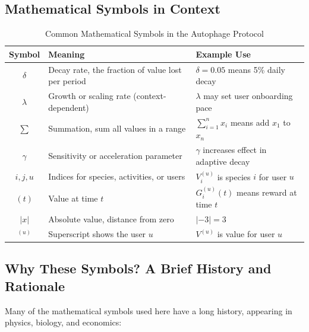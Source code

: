 \documentclass[11pt,letterpaper]{article}
\begin{document}
\subsection*{Mathematical Symbols in Context}

\begin{table}[H]
\centering
\caption{Common Mathematical Symbols in the Autophage Protocol}
\begin{tabular}{cll}
\toprule
\textbf{Symbol} & \textbf{Meaning} & \textbf{Example Use} \\
\midrule
$\delta$ & Decay rate, the fraction of value lost per period & $\delta = 0.05$ means 5\% daily decay \\
$\lambda$ & Growth or scaling rate (context-dependent) & $\lambda$ may set user onboarding pace \\
$\sum$ & Summation, sum all values in a range & $\sum_{i=1}^n x_i$ means add $x_1$ to $x_n$ \\
$\gamma$ & Sensitivity or acceleration parameter & $\gamma$ increases effect in adaptive decay \\
$i, j, u$ & Indices for species, activities, or users & $V_i^{(u)}$ is species $i$ for user $u$ \\
$(t)$ & Value at time $t$ & $G_i^{(u)}(t)$ means reward at time $t$ \\
$|x|$ & Absolute value, distance from zero & $|{-3}| = 3$ \\
$^{(u)}$ & Superscript shows the user $u$ & $V^{(u)}$ is value for user $u$ \\
\bottomrule
\end{tabular}
\end{table}

\subsection*{Why These Symbols? A Brief History and Rationale}

Many of the mathematical symbols used here have a long history, appearing in physics, biology, and economics:
\end{document}
